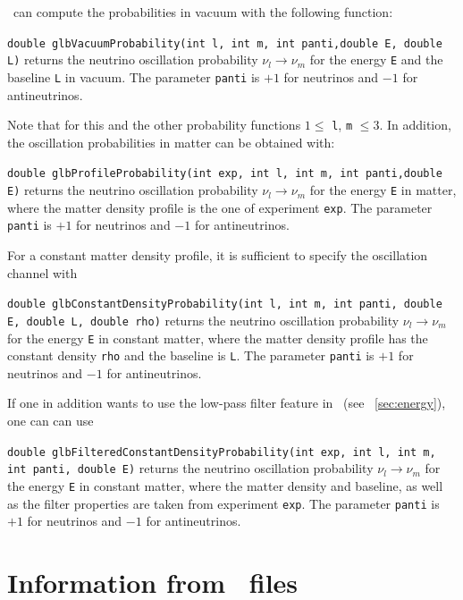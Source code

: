 \GLOBES\ can compute the probabilities in vacuum
with the following function:
\begin{function}
{\tt double glbVacuumProbability(int l, int m, int panti,double E, double L)} returns the neutrino oscillation probability $\nu_l \rightarrow \nu_m$ for the energy {\tt E} and the baseline {\tt L} in vacuum. The parameter
{\tt panti} is $+1$ for neutrinos and $-1$ for antineutrinos. 
\end{function}
Note that for this and the other probability functions $1 \le$ {\tt l}, {\tt m} $\le 3$.
In addition, the oscillation probabilities in matter can be obtained
with:
\begin{function}
{\tt double glbProfileProbability(int exp, int l, int m, int panti,double E)} returns the neutrino oscillation probability $\nu_l \rightarrow \nu_m$ for the energy {\tt E} in matter, where the matter density profile
is the one of experiment {\tt exp}. The parameter
{\tt panti} is $+1$ for neutrinos and $-1$ for antineutrinos.
\end{function}
For a constant matter density profile, it is sufficient to specify the oscillation channel with
\begin{function}
{\tt double glbConstantDensityProbability(int l, int m, int panti, double E, double L, double rho)} returns the neutrino oscillation probability $\nu_l \rightarrow \nu_m$ for the energy {\tt E} in constant matter, where the matter density profile
has the constant density {\tt rho} and the baseline is {\tt L}. The parameter
{\tt panti} is $+1$ for neutrinos and $-1$ for antineutrinos.
\end{function}
If one in addition wants to use the low-pass filter feature in \GLOBES\ (see \Sec~\ref{sec:energy}), one can can use
\begin{function}
{\tt double glbFilteredConstantDensityProbability(int exp, int l, int m, int panti, double E)} returns the neutrino oscillation probability $\nu_l \rightarrow \nu_m$ for the energy {\tt E} in constant matter, where the matter density and baseline, as well as the filter properties are taken from experiment {\tt exp}. The parameter {\tt panti} is $+1$ for neutrinos and $-1$ for antineutrinos.
\end{function}

\section{Information from \AEDL\ files}
\label{sec:aedl_names}

